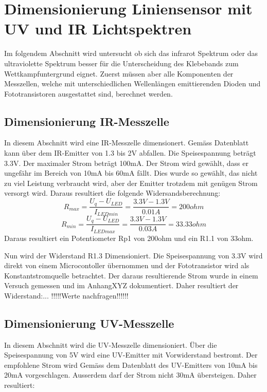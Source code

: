 \documentclass[main.tex]{subfiles} %
\begin{document}

\section{Dimensionierung Liniensensor mit UV und IR Lichtspektren}

Im folgendem Abschnitt wird untersucht ob sich das infrarot Spektrum oder das ultraviolette Spektrum besser für
die Unterscheidung des Klebebands zum Wettkampfuntergrund eignet. Zuerst müssen aber alle Komponenten der Messzellen, 
welche mit unterschiedlichen Wellenlängen emittierenden Dioden und Fototransistoren ausgestattet sind, berechnet werden.


\subsection{Dimensionierung IR-Messzelle}
In diesem Abschnitt wird eine IR-Messzelle dimensionert. Gemäss Datenblatt kann über dem IR-Emitter von 1.3 bis 2V
abfallen. Die Speisespannung beträgt 3.3V. Der maximaler Strom beträgt 100mA. Der Strom wird gewählt, dass er ungefähr im 
Bereich von 10mA bis 60mA fällt. Dies wurde so gewählt, das nicht zu viel Leistung verbraucht wird, aber der Emitter trotzdem 
mit genügen Strom versorgt wird. Daraus resultiert die folgende Widersandsberechnung:
\[
    R_{max} = \frac{U_q - U_{LED}}{I_{LEDmin}} = \frac{3.3V - 1.3V}{0.01A} = 200ohm
\]
\[
    R_{min} = \frac{U_q - U_{LED}}{I_{LEDmax}} = \frac{3.3V - 1.3V}{0.03A} = 33.33ohm
\]
Daraus resultiert ein Potentiometer Rp1 von 200ohm und ein R1.1 von 33ohm.

Nun wird der Widerstand R1.3 Dimensioniert. Die Speisespannung von 3.3V wird direkt von einem Microcontoller übernommen
und der Fototransistor wird als Konstantstromquelle betrachtet. Der daraus resultierende Strom wurde in einem Versuch gemessen
und im AnhangXYZ dokumentiert. Daher resultiert der Widerstand:... !!!!!Werte nachfragen!!!!!!


\subsection{Dimensionierung UV-Messzelle}
In diesem Abschnitt wird die UV-Messzelle dimensioniert.
Über die Speisespannung von 5V wird eine UV-Emitter mit Vorwiderstand bestromt. Der empfohlene Strom
wird Gemäss dem Datenblatt des UV-Emitters von 10mA bis 20mA vorgeschlagen. Ausserdem darf der Strom nicht 
30mA übersteigen. Daher resultiert: 
\end{document}
